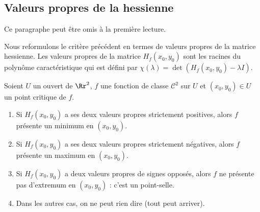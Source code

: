 \subsection{Valeurs propres de la hessienne}

Ce paragraphe peut être omis à la première lecture.

Nous reformulons le critère précédent en termes de valeurs propres de la matrice hessienne.
Les valeurs propres de la matrice $H_f(x_0,y_0)$ sont les racines du polynôme caractéristique qui est défini par $\chi(\lambda)=\det \left( H_f(x_0,y_0)-\lambda I \right)$.

\begin{theoreme}{}{}
Soient $U$ un ouvert de $\Rr^2$, $f$ une fonction de classe $\mathcal{C}^2$ sur $U$ et $(x_0,y_0)\in U$ un point critique de $f$.
\begin{enumerate}
    \item Si $H_f(x_0,y_0)$ a ses deux valeurs propres strictement positives, alors $f$ présente un minimum en $(x_0,y_0)$.
    \item Si $H_f(x_0,y_0)$ a ses deux valeurs propres strictement négatives, alors $f$ présente un maximum en $(x_0,y_0)$.
    \item Si $H_f(x_0,y_0)$ a deux valeurs propres de signes opposés, alors $f$ ne présente pas d'extremum en $(x_0,y_0)$ : c'est un point-selle.
    \item Dans les autres cas, on ne peut rien dire (tout peut arriver).
\end{enumerate}
\end{theoreme}


